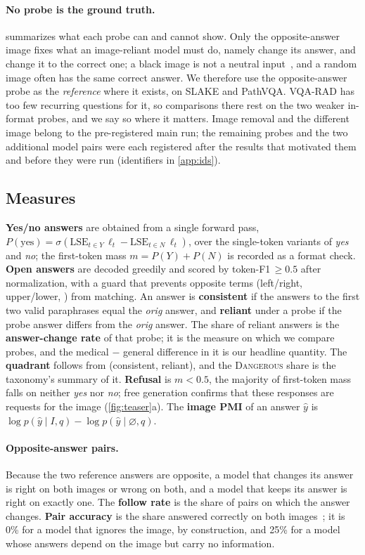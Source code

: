 \documentclass[10pt,twocolumn,letterpaper]{article}
\newcommand{\dang}{\textup{\textsc{Dangerous}}}
\begin{document}
\paragraph{No probe is the ground truth.}  summarizes what each probe can and cannot show. Only
the opposite-answer image fixes what an image-reliant model must do, namely change its answer, and change it to the
correct one; a black image is not a neutral input~\cite{zhang2026uncontrolled}, and a random image often has the
same correct answer. We therefore use the opposite-answer probe as the \emph{reference} where it exists, on SLAKE
and PathVQA. VQA-RAD has too few recurring questions for it, so comparisons there rest on the two weaker in-format
probes, and we say so where it matters. Image removal and the different image belong to the pre-registered main
run; the remaining probes and the two additional model pairs were each registered after the results that motivated
them and before they were run (identifiers in \cref{app:ids}).

\subsection{Measures}
\textbf{Yes/no answers} are obtained from a single forward pass,
$P(\text{yes})=\sigma(\mathrm{LSE}_{t\in Y}\,\ell_t-\mathrm{LSE}_{t\in N}\,\ell_t)$, over the single-token
variants of \emph{yes} and \emph{no}; the first-token mass $m=P(Y)+P(N)$ is recorded as a format check.
\textbf{Open answers} are decoded greedily and scored by token-F1$\,\ge0.5$ after normalization, with a guard that
prevents opposite terms (left/right, upper/lower, \etc) from matching. An answer is \textbf{consistent} if the
answers to the first two valid paraphrases equal the \emph{orig} answer, and \textbf{reliant} under a probe if the
probe answer differs from the \emph{orig} answer. The share of reliant answers is the \textbf{answer-change rate}
of that probe; it is the measure on which we compare probes, and the medical $-$ general difference in it is our
headline quantity. The \textbf{quadrant} follows from (consistent, reliant), and the \dang{} share is the
taxonomy's summary of it. \textbf{Refusal} is $m<0.5$, \ie the majority of first-token mass falls on neither
\emph{yes} nor \emph{no}; free generation confirms that these responses are requests for the image
(\cref{fig:teaser}a). The \textbf{image PMI} of an answer $\hat y$ is
$\log p(\hat y\mid I,q)-\log p(\hat y\mid\varnothing,q)$.

\paragraph{Opposite-answer pairs.} Because the two reference answers are opposite, a model that changes its answer
is right on both images or wrong on both, and a model that keeps its answer is right on exactly one. The
\textbf{follow rate} is the share of pairs on which the answer changes. \textbf{Pair accuracy} is the share
answered correctly on both images~\cite{gardner2020contrast}; it is 0\% for a model that ignores the image, by
construction, and 25\% for a model whose answers depend on the image but carry no information.
\end{document}
